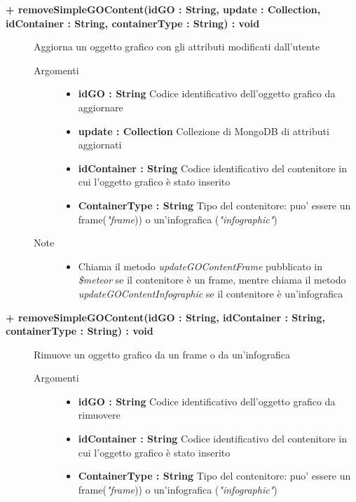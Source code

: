 \begin{description}
	\begin{description}
		\item[\textbf{\color{blue}+ removeSimpleGOContent(idGO : String, update : Collection, idContainer : String, containerType : String) : void			}] \hfill
			Aggiorna un oggetto grafico con gli attributi modificati dall'utente
			
		\begin{description}
			\item[Argomenti] \hfill
				\begin{itemize}
					\item \textbf{idGO : String			} \hfill
					Codice identificativo dell'oggetto grafico da aggiornare
					\item \textbf{update : Collection			} \hfill
					Collezione di MongoDB di attributi aggiornati
					\item \textbf{idContainer : String			} \hfill
					Codice identificativo del contenitore in cui l'oggetto grafico è stato inserito
					\item \textbf{ContainerType : String			} \hfill
					Tipo del contenitore: puo' essere un frame(\textit{"frame})) o un'infografica (\textit{"infographic"})
					
				\end{itemize}
			\item[Note] \hfill
			\begin{itemize}
					\item Chiama il metodo \textit{updateGOContentFrame} pubblicato in \textit{\$meteor} se il contenitore è un frame, mentre chiama il metodo \textit{updateGOContentInfographic} se il contenitore è un'infografica
			\end{itemize}
		\end{description}
	\end{description}
	
	\begin{description}
		\item[\textbf{\color{blue}+ removeSimpleGOContent(idGO : String, idContainer : String, containerType : String) : void			}] \hfill
			Rimuove un oggetto grafico da un frame o da un'infografica
			
		\begin{description}
			\item[Argomenti] \hfill
				\begin{itemize}
					\item \textbf{idGO : String			} \hfill
					Codice identificativo dell'oggetto grafico da rimuovere
					\item \textbf{idContainer : String			} \hfill
					Codice identificativo del contenitore in cui l'oggetto grafico è stato inserito
					\item \textbf{ContainerType : String			} \hfill
					Tipo del contenitore: puo' essere un frame(\textit{"frame})) o un'infografica (\textit{"infographic"})
					

\end{itemize}
\end{description}
\end{description}
\end{description}
